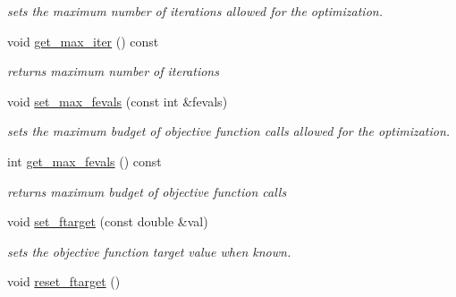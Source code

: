 \begin{DoxyCompactItemize}
\begin{DoxyCompactList}\small\item\em sets the maximum number of iterations allowed for the optimization. \end{DoxyCompactList}\item 
void \hyperlink{classlibcmaes_1_1Parameters_a10ef0d0fa8751d520ed5d4e223e366e4}{get\-\_\-max\-\_\-iter} () const 
\begin{DoxyCompactList}\small\item\em returns maximum number of iterations \end{DoxyCompactList}\item 
void \hyperlink{classlibcmaes_1_1Parameters_aa924cb4c8ffee0d148b63f5c0b55b4ce}{set\-\_\-max\-\_\-fevals} (const int \&fevals)
\begin{DoxyCompactList}\small\item\em sets the maximum budget of objective function calls allowed for the optimization. \end{DoxyCompactList}\item 
int \hyperlink{classlibcmaes_1_1Parameters_af738c73caee922feff43ba29218ea8ad}{get\-\_\-max\-\_\-fevals} () const 
\begin{DoxyCompactList}\small\item\em returns maximum budget of objective function calls \end{DoxyCompactList}\item 
void \hyperlink{classlibcmaes_1_1Parameters_a6ace7e5d230fcf82c70ba2dd3a801f97}{set\-\_\-ftarget} (const double \&val)
\begin{DoxyCompactList}\small\item\em sets the objective function target value when known. \end{DoxyCompactList}\item 
\hypertarget{classlibcmaes_1_1Parameters_aec14ab6c39a12e347080fa7e0f2e7c9f}{void \hyperlink{classlibcmaes_1_1Parameters_aec14ab6c39a12e347080fa7e0f2e7c9f}{reset\-\_\-ftarget} ()}\label{classlibcmaes_1_1Parameters_aec14ab6c39a12e347080fa7e0f2e7c9f}


\end{DoxyCompactItemize}
